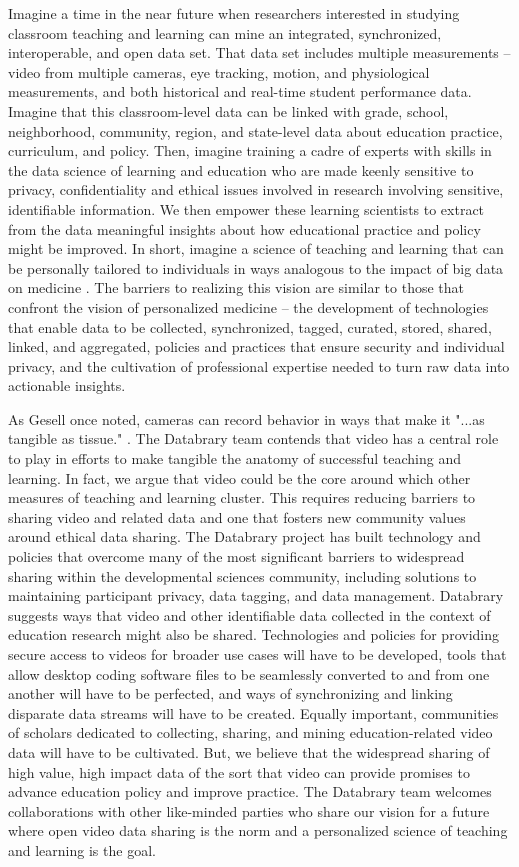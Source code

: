 \documentclass[letterpaper,man,apacite]{apa6}
\begin{document}
Imagine a time in the near future when researchers interested in studying classroom teaching and learning can mine an integrated, synchronized, interoperable, and open data set.
That data set includes multiple measurements -- video from multiple cameras, eye tracking, motion, and physiological measurements, and both historical and real-time student performance data.
Imagine that this classroom-level data can be linked with grade, school, neighborhood, community, region, and state-level data about education practice, curriculum, and policy.
Then, imagine training a cadre of experts with skills in the data science of learning and education who are made keenly sensitive to privacy, confidentiality and ethical issues involved in research involving sensitive, identifiable information.
We then empower these learning scientists to extract from the data meaningful insights about how educational practice and policy might be improved.
In short, imagine a science of teaching and learning that can be personally tailored to individuals in ways analogous to the impact of big data on medicine \cite{BBC2014}.
The barriers to realizing this vision are similar to those that confront the vision of personalized medicine -- the development of technologies that enable data to be collected, synchronized, tagged, curated, stored, shared, linked, and aggregated, policies and practices that ensure security and individual privacy, and the cultivation of professional expertise needed to turn raw data into actionable insights.

As Gesell once noted, cameras can record behavior in ways that make it "...as tangible as tissue." \cite{Scott2011}.
The Databrary team contends that video has a central role to play in efforts to make tangible the anatomy of successful teaching and learning.
In fact, we argue that video could be the core around which other measures of teaching and learning cluster.
This requires reducing barriers to sharing video and related data and one that fosters new community values around ethical data sharing.
The Databrary project has built technology and policies that overcome many of the most significant barriers to widespread sharing within the developmental sciences community, including solutions to maintaining participant privacy, data tagging, and data management. 
Databrary suggests ways that video and other identifiable data collected in the context of education research might also be shared.
Technologies and policies for providing secure access to videos for broader use cases will have to be developed,  tools that allow desktop coding software files to be seamlessly converted to and from one another will have to be perfected, and ways of synchronizing and linking disparate data streams will have to be created.
Equally important, communities of scholars dedicated to collecting, sharing, and mining education-related video data will have to be cultivated.
But, we believe that the widespread sharing of high value, high impact data of the sort that video can provide promises to advance education policy and improve practice.
The Databrary team welcomes collaborations with other like-minded parties who share our vision \cite{Adolph2012} for a future where open video data sharing is the norm and a personalized science of teaching and learning is the goal.


\end{document}
